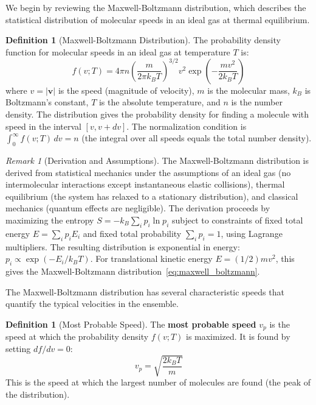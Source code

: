 \documentclass[12pt,a4paper]{article}
\theoremstyle{definition}
\newtheorem{definition}[theorem]{Definition}
\theoremstyle{remark}
\newtheorem{remark}[theorem]{Remark}
\begin{document}
We begin by reviewing the Maxwell-Boltzmann distribution, which describes the statistical distribution of molecular speeds in an ideal gas at thermal equilibrium.

\begin{definition}[Maxwell-Boltzmann Distribution]
\label{def:maxwell_boltzmann}
The probability density function for molecular speeds in an ideal gas at temperature $T$ is:
\begin{equation}
f(v; T) = 4\pi n \left(\frac{m}{2\pi k_B T}\right)^{3/2} v^2 \exp\left(-\frac{mv^2}{2k_B T}\right)
\label{eq:maxwell_boltzmann}
\end{equation}
where $v = |\mathbf{v}|$ is the speed (magnitude of velocity), $m$ is the molecular mass, $k_B$ is Boltzmann's constant, $T$ is the absolute temperature, and $n$ is the number density. The distribution gives the probability density for finding a molecule with speed in the interval $[v, v + dv]$. The normalization condition is $\int_0^\infty f(v; T) \, dv = n$ (the integral over all speeds equals the total number density).
\end{definition}

\begin{remark}[Derivation and Assumptions]
\label{rem:maxwell_boltzmann_derivation}
The Maxwell-Boltzmann distribution is derived from statistical mechanics under the assumptions of an ideal gas (no intermolecular interactions except instantaneous elastic collisions), thermal equilibrium (the system has relaxed to a stationary distribution), and classical mechanics (quantum effects are negligible). The derivation proceeds by maximizing the entropy $S = -k_B \sum_i p_i \ln p_i$ subject to constraints of fixed total energy $E = \sum_i p_i E_i$ and fixed total probability $\sum_i p_i = 1$, using Lagrange multipliers. The resulting distribution is exponential in energy: $p_i \propto \exp(-E_i / k_B T)$. For translational kinetic energy $E = (1/2) m v^2$, this gives the Maxwell-Boltzmann distribution~\eqref{eq:maxwell_boltzmann}.
\end{remark}

The Maxwell-Boltzmann distribution has several characteristic speeds that quantify the typical velocities in the ensemble.

\begin{definition}[Most Probable Speed]
\label{def:most_probable_speed}
The \textbf{most probable speed} $v_p$ is the speed at which the probability density $f(v; T)$ is maximized. It is found by setting $df/dv = 0$:
\begin{equation}
v_p = \sqrt{\frac{2k_B T}{m}}
\label{eq:most_probable_speed}
\end{equation}
This is the speed at which the largest number of molecules are found (the peak of the distribution).
\end{definition}
\end{document}
